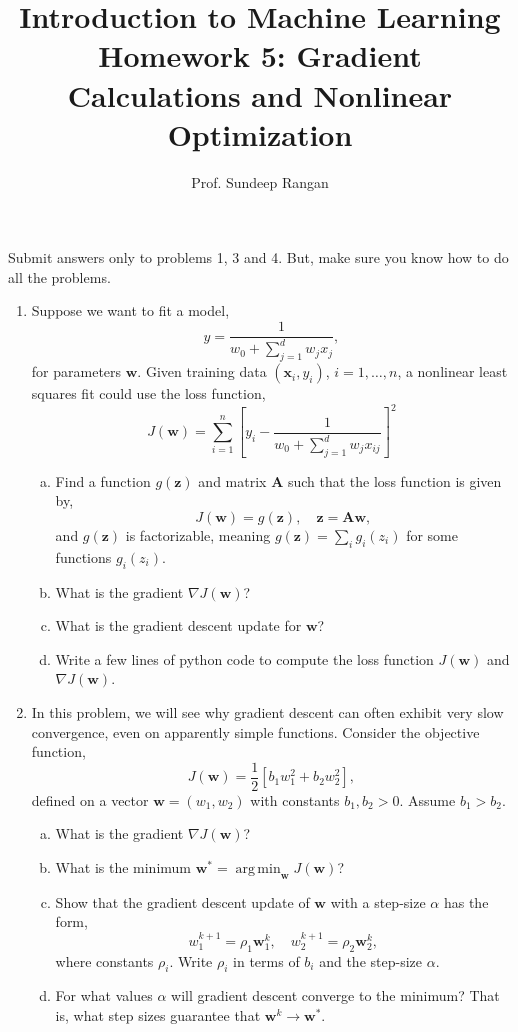 \documentclass[11pt]{article}
\def\argmin{\mathop{\mathrm{arg\,min}}}
\def\arr{\rightarrow}
\newcommand{\wbf}{\mathbf{w}}
\newcommand{\xbf}{\mathbf{x}}
\newcommand{\zbf}{\mathbf{z}}
\newcommand{\Abf}{\mathbf{A}}
\begin{document}
\title{Introduction to Machine Learning\\
Homework 5:  Gradient Calculations and Nonlinear Optimization}
\author{Prof. Sundeep Rangan}
\date{}

\maketitle

Submit answers only to problems 1, 3 and 4.  But, make sure you know how to do
all the problems.

\begin{enumerate}

\item Suppose we want to fit a model,
\[
    \hat{y} = \frac{1}{w_0 + \sum_{j=1}^d w_jx_j},
\]
for parameters $\wbf$. Given training data $(\xbf_i,y_i)$, $i=1,\ldots,n$,
a nonlinear least squares fit could use the loss function,
\[
    J(\wbf) = \sum_{i=1}^n \left[y_i - 
        \frac{1}{w_0 + \sum_{j=1}^d w_jx_{ij}}\right]^2
\]
\begin{enumerate}[(a)]
\item Find a function $g(\zbf)$ and matrix $\Abf$ such that
the loss function is given by,
\[
    J(\wbf) = g(\zbf), \quad \zbf = \Abf\wbf,
\]
and $g(\zbf)$ is factorizable, meaning $g(\zbf) = \sum_i g_i(z_i)$ for
some functions $g_i(z_i)$.

\item What is the gradient $\nabla J(\wbf)$?

\item What is the gradient descent update for $\wbf$?

\item Write a few lines of python code to compute the loss function $J(\wbf)$ and
$\nabla J(\wbf)$.
\end{enumerate}

\item In this problem, we will see why gradient descent can often exhibit
very slow convergence, even on apparently simple functions.
Consider the objective function,
\[
    J(\wbf) = \frac{1}{2}\left[ b_1w_1^2 + b_2w_2^2 \right],
\]
defined on a vector $\wbf=(w_1,w_2)$ with constants $b_1,b_2 > 0$.
Assume $b_1 > b_2$.
\begin{enumerate}[(a)]
  \item What is the gradient $\nabla J(\wbf)$?
  \item What is the minimum $\wbf^* = \argmin_{\wbf} J(\wbf)$?
  \item Show that the gradient descent update of $\wbf$ with a step-size $\alpha$
has the form,
\[
    w_1^{k+1} = \rho_1 \wbf_1^k, \quad w_2^{k+1} = \rho_2 \wbf_2^k,
\]
where constants $\rho_i$.  Write $\rho_i$ in terms of 
$b_i$ and the step-size $\alpha$.
  \item For what values $\alpha$ will gradient descent converge to the minimum? That is, what step sizes guarantee that $\wbf^k \arr \wbf^*$.
      

\end{enumerate}
\end{enumerate}
\end{document}
